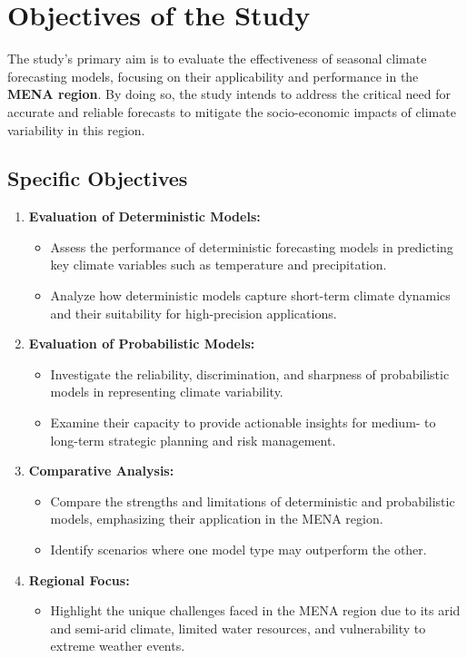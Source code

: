 \section{Objectives of the Study}

The study's primary aim is to evaluate the effectiveness of seasonal climate forecasting models, focusing on their applicability and performance in the \textbf{MENA region}. By doing so, the study intends to address the critical need for accurate and reliable forecasts to mitigate the socio-economic impacts of climate variability in this region.

\subsection{Specific Objectives}

\begin{enumerate}
    \item \textbf{Evaluation of Deterministic Models:}
    \begin{itemize}
        \item Assess the performance of deterministic forecasting models in predicting key climate variables such as temperature and precipitation.
        \item Analyze how deterministic models capture short-term climate dynamics and their suitability for high-precision applications.
    \end{itemize}

    \item \textbf{Evaluation of Probabilistic Models:}
    \begin{itemize}
        \item Investigate the reliability, discrimination, and sharpness of probabilistic models in representing climate variability.
        \item Examine their capacity to provide actionable insights for medium- to long-term strategic planning and risk management.
    \end{itemize}

    \item \textbf{Comparative Analysis:}
    \begin{itemize}
        \item Compare the strengths and limitations of deterministic and probabilistic models, emphasizing their application in the MENA region.
        \item Identify scenarios where one model type may outperform the other.
    \end{itemize}

    \item \textbf{Regional Focus:}
    \begin{itemize}
        \item Highlight the unique challenges faced in the MENA region due to its arid and semi-arid climate, limited water resources, and vulnerability to extreme weather events.
    \end{itemize}
\end{enumerate}

